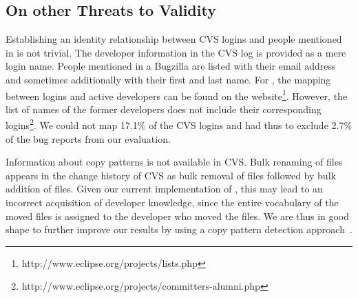 \subsection{On other Threats to Validity}\label{sec:scvmapping}


Establishing an identity relationship between CVS logins and people mentioned in \BRs is not trivial. The developer information in the CVS log is provided as a mere login name. People mentioned in a Bugzilla \BR are listed with their email address and sometimes additionally with their first and last name. For \EC, the mapping between logins and active developers can be found on the \EC website\footnote{http://www.eclipse.org/projects/lists.php}. However, the list of names of the former \EC developers does not include their corresponding logins\footnote{http://www.eclipse.org/projects/committers-alumni.php}. We could not map 17.1\% of the CVS logins and had thus to exclude 2.7\% of the bug reports from our evaluation.   

Information about copy patterns is not available in CVS. Bulk renaming of files appears in the change history of CVS as bulk removal of files followed by bulk addition of files. Given our current implementation of \DEVLECT, this may lead to an incorrect acquisition of developer knowledge, since the entire vocabulary of the moved files is assigned to the developer who moved the files.
We are thus in good shape to further improve our results by using a copy pattern detection approach~\cite{Chan08a}.

%
%
%
%


